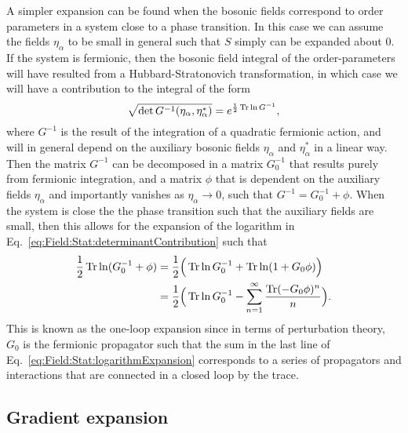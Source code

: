 A simpler expansion can be found when the bosonic fields correspond to order parameters in a system close to a phase transition. In this case
we can assume the fields $\eta_\alpha$ to be small in general such that $S$ simply can be expanded about $0$. If the system is fermionic, then
the bosonic field integral of the order-parameters will have resulted from a Hubbard-Stratonovich transformation, in which case we will have
a contribution to the integral of the form
\begin{equation}
    \label{eq:Field:Stat:determinantContribution}
    \sqrt{\det G^{-1}(\eta_\alpha,\eta_\alpha^\ast)} = e^{\frac{1}{2}\operatorname{Tr}\ln G^{-1}},
\end{equation}
where $G^{-1}$ is the result of the integration of a quadratic fermionic action, and will in general depend on the auxiliary bosonic fields
$\eta_\alpha$ and $\eta_\alpha^\ast$ in a linear way. Then the matrix $G^{-1}$ can be decomposed in a matrix $G_0^{-1}$ that results purely
from fermionic integration, and a matrix $\phi$ that is dependent on the auxiliary fields $\eta_\alpha$ and importantly vanishes as $\eta_\alpha\to0$,
such that $G^{-1} = G_0^{-1} + \phi$. When the system is close the the phase transition such that the auxiliary fields are small, then this
allows for the expansion of the logarithm in Eq.~\eqref{eq:Field:Stat:determinantContribution} such that
\begin{equation}
    \label{eq:Field:Stat:logarithmExpansion}
    \begin{split}
        \frac{1}{2}\operatorname{Tr}\ln(G_0^{-1} + \phi) &= \frac{1}{2}\Big(\operatorname{Tr}\ln G_0^{-1} + \operatorname{Tr}\ln(1+G_0\phi)\Big)\\
        &= \frac{1}{2}\Big(\operatorname{Tr}\ln G_0^{-1} - \sum_{n=1}^\infty\frac{\operatorname{Tr} (-G_0\phi)^n}{n}\Big).
    \end{split}
\end{equation}
This is known as the one-loop expansion since in terms of perturbation theory, $G_0$ is the fermionic propagator such that the sum in the
last line of Eq.~\eqref{eq:Field:Stat:logarithmExpansion} corresponds to a series of propagators and interactions that are connected in
a closed loop by the trace.

\subsection{Gradient expansion}

